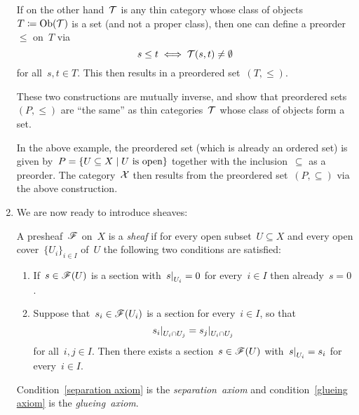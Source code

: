 \begin{example}
\begin{enumerate}
\begin{remark*}
        If on the other hand~$\mathcal{T}$ is any thin category whose class of objects~$T \coloneqq \operatorname{Ob}(\mathcal{T})$ is a set (and not a proper class), then one can define a preorder~$\leq$ on~$T$ via
        \[
                s \leq t
          \iff  \mathcal{T}(s,t) \neq \emptyset
        \]
        for all~$s, t \in T$.
        This then results in a preordered set~$(T, \leq)$.
        
        These two constructions are mutually inverse, and show that preordered sets~$(P,\leq)$ are \enquote{the same} as thin categories~$\mathcal{T}$ whose class of objects form a set.
        
        In the above example, the preordered set (which is already an ordered set) is given by~$P = \{U \subseteq X \suchthat \text{$U$ is open}\}$ together with the inclusion~$\subseteq$ as a preorder.
        The category~$\mathcal{X}$ then results from the preordered set~$(P, \subseteq)$ via the above construction.
      \end{remark*}
      
    \item
      We are now ready to introduce sheaves:
      
      \begin{definitionnonum}
        A presheaf~$\mathscr{F}$ on~$X$ is a \emph{sheaf} if for every open subset~$U \subseteq X$ and every open cover~$\{ U_i \}_{i \in I}$ of~$U$ the following two conditions are satisfied:
        \begin{enumerate}[label=(S\arabic*)]
          \item
            \label{separation axiom}
            If~$s \in \mathscr{F}(U)$ is a section with~$\restrict{s}{U_i} = 0$ for every~$i \in I$ then already~$s = 0$.
          \item
            \label{glueing axiom}
            Suppose that~$s_i \in \mathscr{F}(U_i)$ is a section for every~$i \in I$, so that
            \[
                \restrict{s_i}{U_i \cap U_j}
              = \restrict{s_j}{U_i \cap U_j}
            \]
            for all~$i, j \in I$.
            Then there exists a section~$s \in \mathscr{F}(U)$ with~$\restrict{s}{U_i} = s_i$ for every~$i \in I$.
        \end{enumerate}
        Condition~\ref*{separation axiom} is the \emph{separation~axiom} and condition~\ref*{glueing axiom} is the \emph{glueing~axiom}.
      \end{definitionnonum}
      

\end{enumerate}
\end{example}
